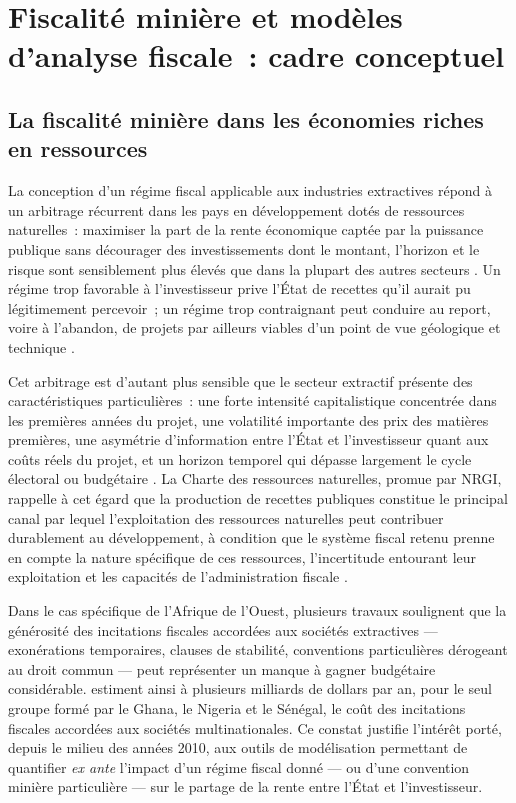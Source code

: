\chapter{Fiscalité minière et modèles d'analyse fiscale~: cadre conceptuel}
\label{chap:cadre}

\section{La fiscalité minière dans les économies riches en ressources}

La conception d'un régime fiscal applicable aux industries extractives répond à un arbitrage récurrent dans les pays en développement dotés de ressources naturelles~: maximiser la part de la rente économique captée par la puissance publique sans décourager des investissements dont le montant, l'horizon et le risque sont sensiblement plus élevés que dans la plupart des autres secteurs \citep{charlet2013}. Un régime trop favorable à l'investisseur prive l'État de recettes qu'il aurait pu légitimement percevoir~; un régime trop contraignant peut conduire au report, voire à l'abandon, de projets par ailleurs viables d'un point de vue géologique et technique \citep{otto2006royalties}.

Cet arbitrage est d'autant plus sensible que le secteur extractif présente des caractéristiques particulières~: une forte intensité capitalistique concentrée dans les premières années du projet, une volatilité importante des prix des matières premières, une asymétrie d'information entre l'État et l'investisseur quant aux coûts réels du projet, et un horizon temporel qui dépasse largement le cycle électoral ou budgétaire \citep{nrgi2015fiscalregime}. La Charte des ressources naturelles, promue par NRGI, rappelle à cet égard que la production de recettes publiques constitue le principal canal par lequel l'exploitation des ressources naturelles peut contribuer durablement au développement, à condition que le système fiscal retenu prenne en compte la nature spécifique de ces ressources, l'incertitude entourant leur exploitation et les capacités de l'administration fiscale \citep{nrgi2014charter}.

Dans le cas spécifique de l'Afrique de l'Ouest, plusieurs travaux soulignent que la générosité des incitations fiscales accordées aux sociétés extractives --- exonérations temporaires, clauses de stabilité, conventions particulières dérogeant au droit commun --- peut représenter un manque à gagner budgétaire considérable. \citet{actionaid2015giveaway} estiment ainsi à plusieurs milliards de dollars par an, pour le seul groupe formé par le Ghana, le Nigeria et le Sénégal, le coût des incitations fiscales accordées aux sociétés multinationales. Ce constat justifie l'intérêt porté, depuis le milieu des années 2010, aux outils de modélisation permettant de quantifier \emph{ex ante} l'impact d'un régime fiscal donné --- ou d'une convention minière particulière --- sur le partage de la rente entre l'État et l'investisseur.

